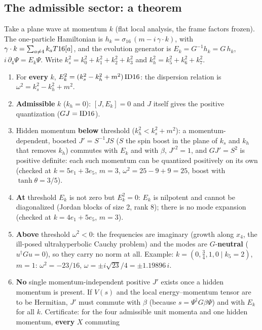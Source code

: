 \subsection{The admissible sector: a theorem}
\label{sec:6.10}

Take a plane wave at momentum $k$ (flat local analysis, the frame factors frozen). The one-particle
Hamiltonian is $h_k=\sigma_{16}\,(m-i\,\gamma\cdot k)$, with $\gamma\cdot k=\sum_{a\neq4}k_aT16[a]$,
and the evolution generator is $E_k=G^{-1}h_k=G\,h_k$, $i\,\partial_4\Psi=E_k\Psi$. Write
$k_s^2=k_0^2+k_1^2+k_2^2+k_3^2$ and $k_h^2=k_5^2+k_6^2+k_7^2$.
\begin{enumerate}
  \item For \textbf{every} $k$, $E_k^2=(k_s^2-k_h^2+m^2)\,\mathrm{ID16}$: the dispersion relation is
        $\omega^2=k_s^2-k_h^2+m^2$.
  \item \textbf{Admissible} $k$ ($k_h=0$): $[J,E_k]=0$ and $J$ itself gives the positive quantization
        ($GJ=\mathrm{ID16}$).
  \item Hidden momentum \textbf{below} threshold ($k_h^2<k_s^2+m^2$): a momentum-dependent, boosted
        $J'=S^{-1}JS$ ($S$ the spin boost in the plane of $k_s$ and $k_h$ that removes $k_h$) commutes
        with $E_k$ and with $\beta$, $J'^2=1$, and $GJ'=S^2$ is positive definite: each such momentum
        can be quantized positively on its own (checked at $k=5e_1+3e_5$, $m=3$,
        $\omega^2=25-9+9=25$, boost with $\tanh\theta=3/5$).
  \item \textbf{At} threshold $E_k$ is not zero but $E_k^2=0$: $E_k$ is nilpotent and cannot be
        diagonalized (Jordan blocks of size 2, rank 8); there is no mode expansion (checked at
        $k=4e_1+5e_5$, $m=3$).
  \item \textbf{Above} threshold $\omega^2<0$: the frequencies are imaginary (growth along $x_4$, the
        ill-posed ultrahyperbolic Cauchy problem) and the modes are $G$-\textbf{neutral}
        ($u^{\dagger}Gu=0$), so they carry no norm at all. Example: $k=(0,\tfrac34,1,0\mid k_5=2)$,
        $m=1$: $\omega^2=-23/16$, $\omega=\pm i\sqrt{23}/4=\pm1.19896\,i$.
  \item \textbf{No} single momentum-independent positive $J'$ exists once a hidden momentum is
        present. If $V(s)$ and the local energy--momentum tensor are to be Hermitian, $J'$ must commute
        with $\beta$ (because $s=\Psi^{\ddagger}G\beta\Psi$) and with $E_k$ for all $k$. Certificate:
        for the four admissible unit momenta and one hidden momentum, \textbf{every} $X$ commuting

\end{enumerate}
